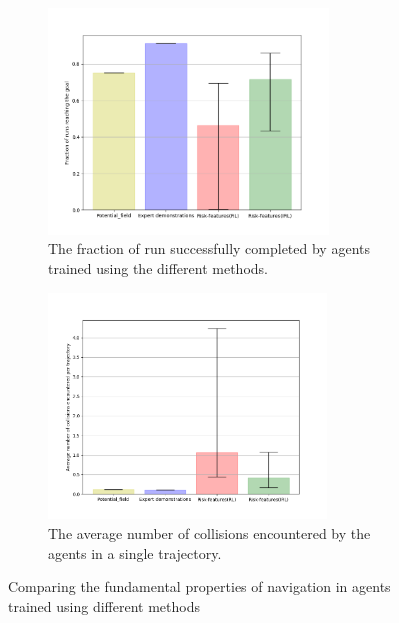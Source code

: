 \begin{figure}[htbp]
    \begin{subfigure}{0.5\textwidth}
        \centering
        \includegraphics[width=0.95\linewidth, height=6cm]{plots/ucy_inter_method_new/goal_reached_ucy_inter_method.png}
        \caption{The fraction of run successfully completed by agents trained using the different methods.}
        \label{fig:inter_method-goal_reached}
    \end{subfigure}
        \begin{subfigure}{0.5\textwidth}
            \centering
        \includegraphics[width=0.95\linewidth, height=6cm]{plots/ucy_inter_method_new/count_collisions_ucy_inter_method.png}
        \caption{The average number of collisions encountered by the agents in a single trajectory.}
        \label{fig:inter_method-collision_counts}
    \end{subfigure}
\caption{Comparing the fundamental properties of navigation in agents trained using different methods}
\end{figure}\\

